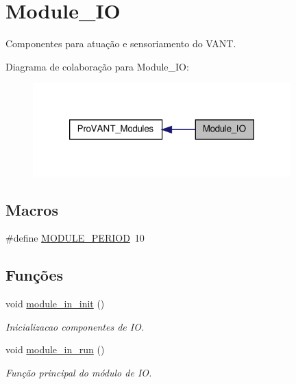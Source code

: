 \hypertarget{group__Module__IO}{\section{Module\-\_\-\-I\-O}
\label{group__Module__IO}
}


Componentes para atuação e sensoriamento do V\-A\-N\-T.  


Diagrama de colaboração para Module\-\_\-\-I\-O\-:
\nopagebreak
\begin{figure}[H]
\begin{center}
\leavevmode
\includegraphics[width=282pt]{group__Module__IO}
\end{center}
\end{figure}
\subsection*{Macros}
\begin{DoxyCompactItemize}
\item 
\#define \hyperlink{group__Module__IO_ga0ac6c9f2991b096e49c354e5cce6fae0}{M\-O\-D\-U\-L\-E\-\_\-\-P\-E\-R\-I\-O\-D}~10
\end{DoxyCompactItemize}
\subsection*{Funções}
\begin{DoxyCompactItemize}
\item 
void \hyperlink{group__Module__IO_gaffe0980a750cbec13ebf241c933460dd}{module\-\_\-in\-\_\-init} ()
\begin{DoxyCompactList}\small\item\em Inicializacao componentes de I\-O. \end{DoxyCompactList}\item 
void \hyperlink{group__Module__IO_ga2b56089e4c5adb9ac8b7a41fc1a0b0b2}{module\-\_\-in\-\_\-run} ()
\begin{DoxyCompactList}\small\item\em Função principal do módulo de I\-O. \end{DoxyCompactList}\end{DoxyCompactItemize}
